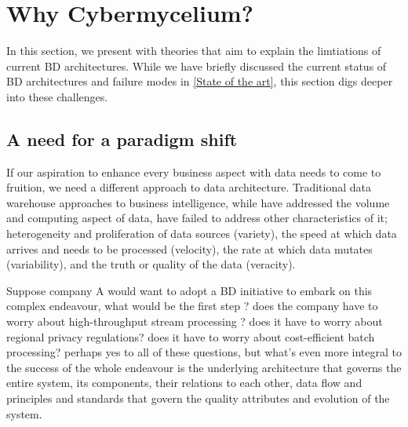 \documentclass[review]{elsarticle}
\begin{document}

        

                


\section{Why Cybermycelium?} \label{theory-section}

In this section, we present with theories that aim to explain the limtiations of current BD architectures. While we have briefly discussed the current status of BD architectures and failure modes in \ref{State of the art}, this section digs deeper into these challenges. 

\subsection{A need for a paradigm shift} \label{need for paradigm shift}

If our aspiration to enhance every business aspect with data needs to come to fruition, we need a different approach to data architecture. Traditional data warehouse approaches to business intelligence, while have addressed the volume and computing aspect of data, have failed to address other characteristics of it; heterogeneity and proliferation of data sources (variety), the speed at which data arrives and needs to be processed (velocity), the rate at which data mutates (variability), and the truth or quality of the data (veracity).


Suppose company A would want to adopt a BD initiative to embark on this complex endeavour, what would be the first step ? does the company have to worry about high-throughput stream processing ? does it have to worry about regional privacy regulations? does it have to worry about cost-efficient batch processing? perhaps yes to all of these questions, but what's even more integral to the success of the whole endeavour is the underlying architecture that governs the entire system, its components, their relations to each other, data flow and principles and standards that govern the quality attributes and evolution of the system.
\end{document}
